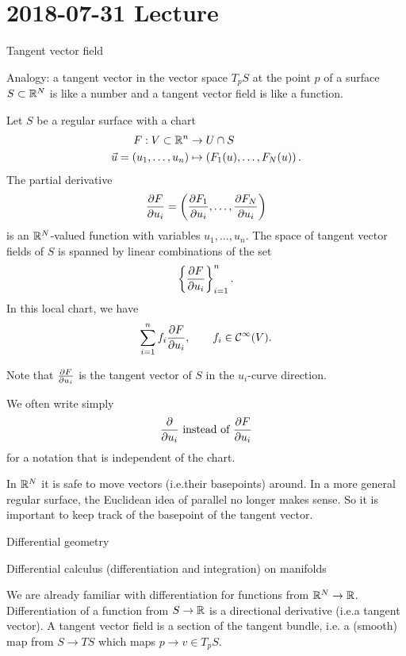 \section{2018-07-31 Lecture}

Tangent vector field

Analogy: a tangent vector in the vector space $T_pS$ at the point $p$ of a surface $S \subset \mathbb{R}^N$ is like a number and a tangent vector field is like a function.

\begin{defn}
  Let $S$ be a regular surface with a chart
  \begin{align*}
    F: V \subset \mathbb{R}^n &\to U \cap S \\
    \vec u = (u_1,\ldots,u_n) &\mapsto \left( F_1(u),\ldots,F_N(u) \right).
  \end{align*}
  The partial derivative
  \[ \frac{\partial F}{\partial u_i} = \left( \frac{\partial F_1}{\partial u_i}, \ldots, \frac{\partial F_N}{\partial u_i} \right) \]
  is an $\mathbb{R}^N$-valued function with variables $u_1,\ldots,u_n$.
  The space of tangent vector fields of $S$ is spanned by linear combinations of the set
  \[ \left\{ \frac{\partial F}{\partial u_i} \right\}_{i=1}^n. \]
  In this local chart, we have
  \[ \sum_{i=1}^n f_i \frac{\partial F}{\partial u_i}, \qquad f_i \in \mathcal{C}^\infty(V). \]
\end{defn}

\begin{rmk}
  Note that $\tfrac{\partial F}{\partial u_i}$ is the tangent vector of $S$ in the $u_i$-curve direction.
\end{rmk}

\begin{rmk}
  We often write simply
  \[ \frac{\partial}{\partial u_i} \text{ instead of } \frac{\partial F}{\partial u_i} \]
  for a notation that is independent of the chart.
\end{rmk}

\begin{rmk}
  In $\mathbb{R}^N$ it is safe to move vectors (i.e.\@ their basepoints) around.
  In a more general regular surface, the Euclidean idea of parallel no longer makes sense.
  So it is important to keep track of the basepoint of the tangent vector.
\end{rmk}

Differential geometry

Differential calculus (differentiation and integration) on manifolds

We are already familiar with differentiation for functions from $\mathbb{R}^N \to \mathbb{R}$.
Differentiation of a function from $S \to \mathbb{R}$ is a directional derivative (i.e.\@ a tangent vector).
A tangent vector field is a section of the tangent bundle, i.e. a (smooth) map from $S \to TS$ which maps $p \to v \in T_pS$.

